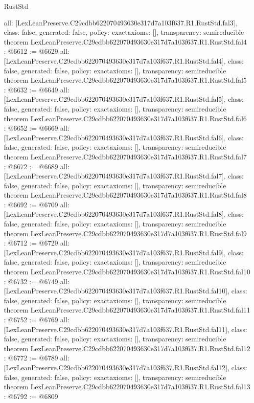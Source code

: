 \begin{lexlean}{RustStd}
\begin{coremodule}
{  all: [LexLeanPreserve.C29cdbb622070493630e317d7a103f637.R1.RustStd.fal3],
  class: false,
  generated: false,
  policy: exact{axioms: []},
  transparency: semireducible
}
theorem LexLeanPreserve.C29cdbb622070493630e317d7a103f637.R1.RustStd.fal4 : @6612 := @6629 {
  all: [LexLeanPreserve.C29cdbb622070493630e317d7a103f637.R1.RustStd.fal4],
  class: false,
  generated: false,
  policy: exact{axioms: []},
  transparency: semireducible
}
theorem LexLeanPreserve.C29cdbb622070493630e317d7a103f637.R1.RustStd.fal5 : @6632 := @6649 {
  all: [LexLeanPreserve.C29cdbb622070493630e317d7a103f637.R1.RustStd.fal5],
  class: false,
  generated: false,
  policy: exact{axioms: []},
  transparency: semireducible
}
theorem LexLeanPreserve.C29cdbb622070493630e317d7a103f637.R1.RustStd.fal6 : @6652 := @6669 {
  all: [LexLeanPreserve.C29cdbb622070493630e317d7a103f637.R1.RustStd.fal6],
  class: false,
  generated: false,
  policy: exact{axioms: []},
  transparency: semireducible
}
theorem LexLeanPreserve.C29cdbb622070493630e317d7a103f637.R1.RustStd.fal7 : @6672 := @6689 {
  all: [LexLeanPreserve.C29cdbb622070493630e317d7a103f637.R1.RustStd.fal7],
  class: false,
  generated: false,
  policy: exact{axioms: []},
  transparency: semireducible
}
theorem LexLeanPreserve.C29cdbb622070493630e317d7a103f637.R1.RustStd.fal8 : @6692 := @6709 {
  all: [LexLeanPreserve.C29cdbb622070493630e317d7a103f637.R1.RustStd.fal8],
  class: false,
  generated: false,
  policy: exact{axioms: []},
  transparency: semireducible
}
theorem LexLeanPreserve.C29cdbb622070493630e317d7a103f637.R1.RustStd.fal9 : @6712 := @6729 {
  all: [LexLeanPreserve.C29cdbb622070493630e317d7a103f637.R1.RustStd.fal9],
  class: false,
  generated: false,
  policy: exact{axioms: []},
  transparency: semireducible
}
theorem LexLeanPreserve.C29cdbb622070493630e317d7a103f637.R1.RustStd.fal10 : @6732 := @6749 {
  all: [LexLeanPreserve.C29cdbb622070493630e317d7a103f637.R1.RustStd.fal10],
  class: false,
  generated: false,
  policy: exact{axioms: []},
  transparency: semireducible
}
theorem LexLeanPreserve.C29cdbb622070493630e317d7a103f637.R1.RustStd.fal11 : @6752 := @6769 {
  all: [LexLeanPreserve.C29cdbb622070493630e317d7a103f637.R1.RustStd.fal11],
  class: false,
  generated: false,
  policy: exact{axioms: []},
  transparency: semireducible
}
theorem LexLeanPreserve.C29cdbb622070493630e317d7a103f637.R1.RustStd.fal12 : @6772 := @6789 {
  all: [LexLeanPreserve.C29cdbb622070493630e317d7a103f637.R1.RustStd.fal12],
  class: false,
  generated: false,
  policy: exact{axioms: []},
  transparency: semireducible
}
theorem LexLeanPreserve.C29cdbb622070493630e317d7a103f637.R1.RustStd.fal13 : @6792 := @6809 {
}
\end{coremodule}
\end{lexlean}
